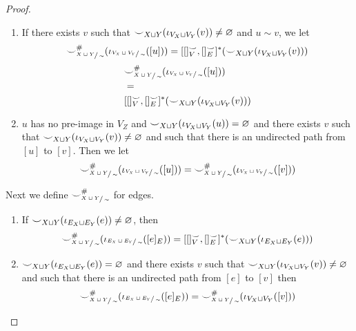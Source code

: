 \begin{proof}
	\begin{enumerate}
		\item If there exists $v$ such that ${\smile}_{X\sqcup Y}(\iota_{V_{X} \sqcup  V_{Y}}(v)) \not = \varnothing$ and $u \sim v$, we let
		      \ifdefined \ONECOLUMN
			      \[
				      {\smile}_{\sfrac{X\sqcup Y}{\sim}}^{{\#}}(\iota_{\sfrac{V_{X} \sqcup  V_{Y}}{\sim}}([u]))
				      =
				      [[]_{V}^{{\smile}},[]_{E}^{{\smile}}]^{*}({\smile}_{X\sqcup Y}(\iota_{V_{X} \sqcup  V_{Y}}(v)))
			      \]
		      \else
			      \begin{align*}
				       & {\smile}_{\sfrac{X\sqcup Y}{\sim}}^{{\#}}(\iota_{\sfrac{V_{X} \sqcup  V_{Y}}{\sim}}([u]))           \\
				       & =                                                                                                           \\
				       & [[]_{V}^{{\smile}},[]_{E}^{{\smile}}]^{*}({\smile}_{X\sqcup Y}(\iota_{V_{X} \sqcup  V_{Y}}(v)))
			      \end{align*}
		      \fi
		\item $u$ has no pre-image in $V_{Z}$ and ${\smile}_{X\sqcup Y}(\iota_{V_{X} \sqcup  V_{Y}}(u)) = \varnothing$ and there exists $v$ such that ${\smile}_{X\sqcup Y}(\iota_{V_{X} \sqcup  V_{Y}}(v)) \not = \varnothing$ and such that there is an undirected path from $[u]$ to $[v]$.
		      Then we let
		      \[
			      {\smile}_{\sfrac{X\sqcup Y}{\sim}}^{{\#}}(\iota_{\sfrac{V_{X} \sqcup  V_{Y}}{\sim}}([u])) = {\smile}_{\sfrac{X\sqcup Y}{\sim}}^{{\#}}(\iota_{\sfrac{V_{X} \sqcup  V_{Y}}{\sim}}([v]))
		      \]
	\end{enumerate}

	Next we define ${\smile}_{\sfrac{X\sqcup Y}{\sim}}^{{\#}}$ for edges.

	\begin{enumerate}
		\item If ${\smile}_{X\sqcup Y}(\iota_{E_{X} \sqcup  E_{Y}}(e)) \not = \varnothing$, then
		      \begin{align*}
			      {\smile}_{\sfrac{X\sqcup Y}{\sim}}^{{\#}}(\iota_{\sfrac{E_{X} \sqcup  E_{Y}}{\sim}}([e]_{E})) =
			      [[]_{V}^{{\smile}}, []_{E}^{{\smile}}]^{*}({\smile}_{X\sqcup Y}(\iota_{E_{X} \sqcup  E_{Y}}(e)))
		      \end{align*}
		\item ${\smile}_{X\sqcup Y}(\iota_{E_{X} \sqcup  E_{Y}}(e)) = \varnothing$ and there exists $v$ such that ${\smile}_{X\sqcup Y}(\iota_{V_{X} \sqcup  V_{Y}}(v)) \not = \varnothing$ and such that there is an undirected path from $[e]$ to $[v]$
		      then
		      \[
			      {\smile}_{\sfrac{X\sqcup Y}{\sim}}^{{\#}}(\iota_{\sfrac{E_{X} \sqcup  E_{Y}}{\sim}}([e]_{E})) = {\smile}_{\sfrac{X\sqcup Y}{\sim}}^{{\#}}(\iota_{V_{X} \sqcup  V_{Y}}([v]))
		      \]
	\end{enumerate}


\end{proof}
